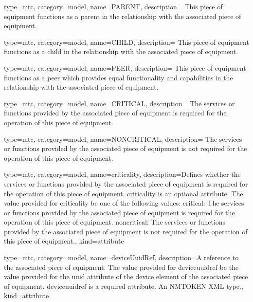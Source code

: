 {
  type=mtc,
  category=model,
  name={PARENT},
  description={  This piece of equipment functions as a parent in the relationship with the associated piece of equipment.}
}


{
  type=mtc,
  category=model,
  name={CHILD},
  description={  This piece of equipment functions as a child in the relationship with the associated piece of equipment.}
}


{
  type=mtc,
  category=model,
  name={PEER},
  description={  This piece of equipment functions as a peer which provides equal functionality and capabilities in the relationship with the associated piece of equipment.}
}


{
  type=mtc,
  category=model,
  name={CRITICAL},
  description={  The services or functions provided by the associated piece of equipment is required for the operation of this piece of equipment.}
}


{
  type=mtc,
  category=model,
  name={NONCRITICAL},
  description={  The services or functions provided by the associated piece of equipment is not required for the operation of this piece of equipment.}
}


{
  type=mtc,
  category=model,
  name={criticality},
  description={Defines whether the services or functions provided by the associated piece of equipment is required for the operation of this piece of equipment.
  \newline \gls{criticality} is an optional attribute.
  \newline The value provided for \gls{criticality} \MUST be one of the following values:
  \newline \tab \gls{critical}:  The services or functions provided by the associated piece of equipment is required for the operation of this piece of equipment.
  \newline \tab \gls{noncritical}:  The services or functions provided by the associated piece of equipment is not required for the operation of this piece of equipment.},
  kind={attribute}
}


{
  type=mtc,
  category=model,
  name={deviceUuidRef},
  description={A reference to the associated piece of equipment.
  \newline The value provided for \gls{deviceuuidref} \MUST be the value provided for the \gls{uuid} attribute of the \gls{device} element of the associated piece of equipment.
  \newline \gls{deviceuuidref} is a required attribute.
  \newline An NMTOKEN XML type.},
  kind={attribute}
}


